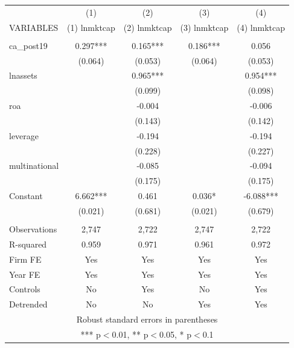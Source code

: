\begin{tabular}{lcccc} \hline
 & (1) & (2) & (3) & (4) \\
VARIABLES & (1) lnmktcap & (2) lnmktcap & (3) lnmktcap & (4) lnmktcap \\ \hline
 &  &  &  &  \\
ca\_post19 & 0.297*** & 0.165*** & 0.186*** & 0.056 \\
 & (0.064) & (0.053) & (0.064) & (0.053) \\
lnassets &  & 0.965*** &  & 0.954*** \\
 &  & (0.099) &  & (0.098) \\
roa &  & -0.004 &  & -0.006 \\
 &  & (0.143) &  & (0.142) \\
leverage &  & -0.194 &  & -0.194 \\
 &  & (0.228) &  & (0.227) \\
multinational &  & -0.085 &  & -0.094 \\
 &  & (0.175) &  & (0.175) \\
Constant & 6.662*** & 0.461 & 0.036* & -6.088*** \\
 & (0.021) & (0.681) & (0.021) & (0.679) \\
 &  &  &  &  \\
Observations & 2,747 & 2,722 & 2,747 & 2,722 \\
R-squared & 0.959 & 0.971 & 0.961 & 0.972 \\
Firm FE & Yes & Yes & Yes & Yes \\
Year FE & Yes & Yes & Yes & Yes \\
Controls & No & Yes & No & Yes \\
 Detrended & No & No & Yes & Yes \\ \hline
\multicolumn{5}{c}{ Robust standard errors in parentheses} \\
\multicolumn{5}{c}{ *** p$<$0.01, ** p$<$0.05, * p$<$0.1} \\
\end{tabular}

